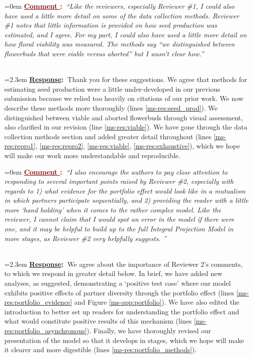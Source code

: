 \documentclass[12pt]{article}
\newcounter{cN}
\newcommand{\comment}[1]{
	\vspace{2em}
	\refstepcounter{cN} %
	\noindent \hangindent=0em \textbf{\textcolor{Maroon}{\uline{Comment \thecN}:~}}\emph{``#1''}
	}
\newcommand{\response}[1]{
	\\[0.25em]
	\hangindent=2.3em \textbf{\textcolor{NavyBlue}{\uline{Response}:~}}#1
	}
\begin{document}
\comment{Like the reviewers, especially Reviewer \#1, I could also have used a little more detail on some of the data collection methods. Reviewer \#1 notes that little information is provided on how seed production was estimated, and I agree. For my part, I could also have used a little more detail on how floral viability was measured. The methods say “we distinguished between flowerbuds that were viable versus aborted” but I wasn’t clear how.}
\response{Thank you for these suggestions. 
	We agree that methods for estimating seed production were a little under-developed in our previous submission because we relied too heavily on citations of our prior work. 
	We now describe these methods more thoroughly (lines \ref{ms-res:seed_prod}). 
	We distinguished between viable and aborted flowerbuds through visual assessment, also clarified in our revision (line \ref{ms-res:viable}). 
	We have gone through the data collection methods section and added greater detail throughout (lines \ref{ms-res:repro1}, \ref{ms-res:repro2},  \ref{ms-res:viable}, \ref{ms-res:exhaustive}), which we hope will make our work more understandable and reproducible.}

\comment{I also encourage the authors to pay close attention to responding to several important points raised by Reviewer \#2, especially with regards to 1) what evidence for the portfolio effect would look like in a mutualism in which partners participate sequentially, and 2) providing the reader with a little more ‘hand holding’ when it comes to the rather complex model. Like the reviewer, I cannot claim that I would spot an error in the model if there were one, and it may be helpful to build up to the full Integral Projection Model in more stages, as Reviewer \#2 very helpfully suggests. }
\response{We agree about the importance of Reviewer 2's comments, to which we respond in greater detail below. 
	In brief, we have added new analyses, as suggested, demonstrating a `positive test case' where our model exhibits positive effects of partner diversity through the portfolio effect (lines \ref{ms-res:portfolio_evidence} and Figure \ref{ms-app:portfolio}). 
	We have also edited the introduction to better set up readers for understanding the portfolio effect and what would constitute positive results of this mechanism (lines \ref{ms-res:portfolio_asynchronous}). 
	Finally, we have thoroughly revised our presentation of the model so that it develops in stages, which we hope will make it clearer and more digestible (lines \ref{ms-res:portfolio_methods}). }
\end{document}
